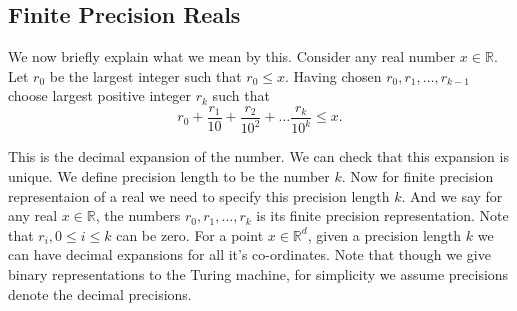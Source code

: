 \documentclass[a4paper,11pt]{article}
\theoremstyle{definition}
\theoremstyle{remark}
\begin{document}
	
	
	\subsection{Finite Precision Reals}
	We now briefly explain what we mean by this.
	Consider any real number $x \in \mathbb{R}$. Let $r_0$ be the largest integer such that $r_0 \leq x$. Having chosen $r_0,r_1,\ldots,r_{k-1}$ choose largest positive integer $r_k$ such that
	\[ r_0 + \frac{r_1}{10} + \frac{r_2}{10^2} + \ldots \frac{r_k}{10^k} \leq x. \]
	
	This is the decimal expansion of the number. We can check that this expansion is unique. We define precision length to be the number $k$.
	Now for finite precision representaion of a real we need to specify this precision length $k$. And we say for any real $x \in \mathbb{R}$, the numbers $r_0,r_1,\ldots,r_k$ is its finite precision representation. Note that $r_i, 0\leq i \leq k$ can be zero.  %
	For a point $x \in \mathbb{R}^d$, given a precision length $k$ we can have decimal expansions for all it's co-ordinates.
	Note that though we give binary representations to the Turing machine, for simplicity we assume precisions denote the decimal precisions.
	
\end{document}
